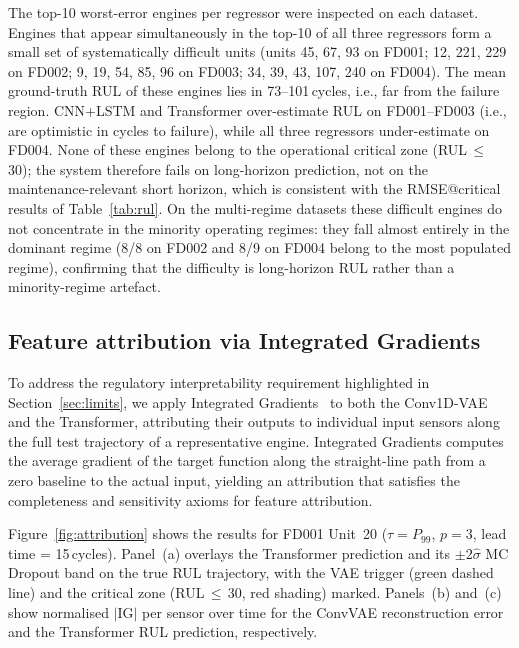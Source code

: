 \documentclass[5p,times,authoryear]{elsarticle}
\begin{document}
The top-10 worst-error engines per regressor were inspected on each dataset. Engines that appear simultaneously in the top-10 of all three regressors form a small set of systematically difficult units (units 45, 67, 93 on FD001; 12, 221, 229 on FD002; 9, 19, 54, 85, 96 on FD003; 34, 39, 43, 107, 240 on FD004). The mean ground-truth RUL of these engines lies in 73--101\,cycles, i.e., far from the failure region. CNN+LSTM and Transformer over-estimate RUL on FD001--FD003 (i.e., are optimistic in cycles to failure), while all three regressors under-estimate on FD004. None of these engines belong to the operational critical zone (RUL\,$\le$\,30); the system therefore fails on long-horizon prediction, not on the maintenance-relevant short horizon, which is consistent with the RMSE@critical results of Table~\ref{tab:rul}. On the multi-regime datasets these difficult engines do not concentrate in the minority operating regimes: they fall almost entirely in the dominant regime (8/8 on FD002 and 8/9 on FD004 belong to the most populated regime), confirming that the difficulty is long-horizon RUL rather than a minority-regime artefact.

\subsection{Feature attribution via Integrated Gradients}\label{sec:results-attribution}

To address the regulatory interpretability requirement highlighted in Section~\ref{sec:limits}, we apply Integrated Gradients~\citep{sundararajan2017axiomatic} to both the Conv1D-VAE and the Transformer, attributing their outputs to individual input sensors along the full test trajectory of a representative engine. Integrated Gradients computes the average gradient of the target function along the straight-line path from a zero baseline to the actual input, yielding an attribution that satisfies the completeness and sensitivity axioms for feature attribution.

Figure~\ref{fig:attribution} shows the results for FD001 Unit~20 ($\tau{=}P_{99}$, $p{=}3$, lead time = 15\,cycles). Panel~(a) overlays the Transformer prediction and its $\pm 2\hat\sigma$ MC Dropout band on the true RUL trajectory, with the VAE trigger (green dashed line) and the critical zone (RUL\,$\le$\,30, red shading) marked. Panels~(b) and~(c) show normalised $|\mathrm{IG}|$ per sensor over time for the ConvVAE reconstruction error and the Transformer RUL prediction, respectively.
\end{document}
